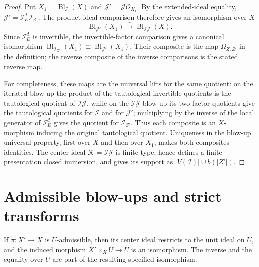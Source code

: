 \begin{proof}
  Put $X_1=\operatorname{Bl}_{\mathcal I}(X)$ and
  $\mathcal J'=\mathcal J\mathcal O_{X_1}$.  By the extended-ideal equality,
  $\mathcal J'=\mathcal I_E^d\mathcal I_{Z'}$.  The product-ideal comparison
   therefore gives an isomorphism over
  $X$
  \[
    \operatorname{Bl}_{\mathcal J'}(X_1)
      \xrightarrow{\sim}\operatorname{Bl}_{\mathcal I\mathcal J}(X).
  \]
  Since $\mathcal I_E^d$ is invertible, the invertible-factor comparison
   gives a canonical isomorphism
  $\operatorname{Bl}_{\mathcal I_{Z'}}(X_1)\cong
    \operatorname{Bl}_{\mathcal J'}(X_1)$.  Their composite is the map
  $\Omega_{Z,Z'}$ in the definition; the reverse composite of the inverse
  comparisons is the stated reverse map.

  For completeness, these maps are the universal lifts for the same quotient:
  on the iterated blow-up the product of the tautological invertible quotients
  is the tautological quotient of $\mathcal I\mathcal J$, while on the
  $\mathcal I\mathcal J$-blow-up its two factor quotients give the tautological
  quotients for $\mathcal I$ and for $\mathcal J'$; multiplying by the inverse
  of the local generator of $\mathcal I_E^d$ gives the quotient for
  $\mathcal I_{Z'}$.  Thus each composite is an $X$-morphism inducing the
  original tautological quotient.  Uniqueness in the blow-up universal
  property, first over $X$ and then over $X_1$, makes both composites identities.
  The center ideal $\mathcal K=\mathcal I\mathcal J$ is finite type, hence
  defines a finite-presentation closed immersion, and
   gives its support as
  $|V(\mathcal I)|\cup b(|Z'|)$.
\end{proof}


\section{Admissible blow-ups and strict transforms}

\begin{lemma}
  \label{lemma:nagata-admissible-blowup-over-open}

  If $\pi\colon X'\to X$ is $U$-admissible, then its center ideal restricts to
  the unit ideal on $U$, and the induced morphism
  $X'\times_XU\to U$ is an isomorphism.  The inverse and the equality over
  $U$ are part of the resulting specified isomorphism.
\end{lemma}

